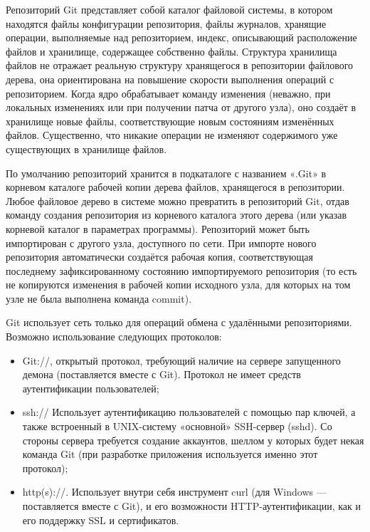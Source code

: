 Репозиторий Git представляет собой каталог файловой системы, в котором находятся файлы конфигурации репозитория, файлы журналов, хранящие операции, выполняемые над репозиторием, индекс, описывающий расположение файлов и хранилище, содержащее собственно файлы. Структура хранилища файлов не отражает реальную структуру хранящегося в репозитории файлового дерева, она ориентирована на повышение скорости выполнения операций с репозиторием. Когда ядро обрабатывает команду изменения (неважно, при локальных изменениях или при получении патча от другого узла), оно создаёт в хранилище новые файлы, соответствующие новым состояниям изменённых файлов. Существенно, что никакие операции не изменяют содержимого уже существующих в хранилище файлов.

По умолчанию репозиторий хранится в подкаталоге с названием «.Git» в корневом каталоге рабочей копии дерева файлов, хранящегося в репозитории. Любое файловое дерево в системе можно превратить в репозиторий Git, отдав команду создания репозитория из корневого каталога этого дерева (или указав корневой каталог в параметрах программы). Репозиторий может быть импортирован с другого узла, доступного по сети. При импорте нового репозитория автоматически создаётся рабочая копия, соответствующая последнему зафиксированному состоянию импортируемого репозитория (то есть не копируются изменения в рабочей копии исходного узла, для которых на том узле не была выполнена команда commit).

Git использует сеть только для операций обмена с удалёнными репозиториями. Возможно использование следующих протоколов:
\begin{itemize}
  \item Git://, открытый протокол, требующий наличие на сервере запущенного демона (поставляется вместе с Git). Протокол не имеет средств аутентификации пользователей;
  \item ssh:// Использует аутентификацию пользователей с помощью пар ключей, а также встроенный в UNIX-систему «основной» SSH-сервер (sshd). Со стороны сервера требуется создание аккаунтов, шеллом у которых будет некая команда Git (при разработке приложения используется именно этот протокол);
  \item http(s)://. Использует внутри себя инструмент curl (для Windows — поставляется вместе с Git), и его возможности HTTP-аутентификации, как и его поддержку SSL и сертификатов.
\end{itemize}

